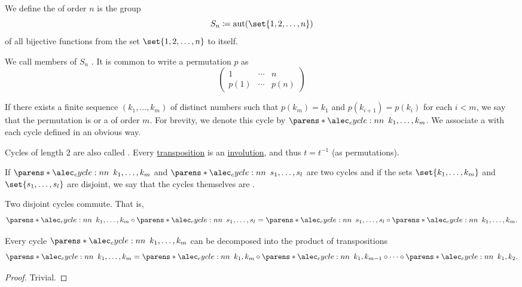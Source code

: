 \begin{definition}\label{def:symmetric_group}
  We define the  of order \( n \) is the group
  \begin{equation*}
    S_n \coloneqq \aut(\set{ 1, 2, \ldots, n })
  \end{equation*}
  of all bijective functions from the set \( \set{ 1, 2, \ldots, n } \) to itself.

  \begin{thmenum}
     We call members of \( S_n \) . It is common to write a permutation \( p \) as
    \begin{equation*}
      \begin{pmatrix}
        1    & \cdots & n \\
        p(1) & \cdots & p(n)
      \end{pmatrix}
    \end{equation*}

     If there exists a finite sequence \( (k_1, \ldots, k_m) \) of distinct numbers such that \( p(k_m) = k_1 \) and \( p(k_{i+1}) = p(k_i) \) for each \( i < m \), we say that the permutation is  or a  of order \( m \). For brevity, we denote this cycle by \( \cycle{k_1, \ldots, k_m} \). We associate a  with each cycle defined in an obvious way.

    Cycles of length \( 2 \) are also called . Every \hyperref[def:symmetric_group/cycle]{transposition} is an \hyperref[def:set_with_involution]{involution}, and thus \( t = t^{-1} \) (as permutations).

     If \( \cycle{k_1, \ldots, k_m} \) and \( \cycle{s_1, \ldots, s_l} \) are two cycles and if the sets \( \set{ k_1, \ldots, k_m } \) and \( \set{ s_1, \ldots, s_l } \) are disjoint, we say that the cycles themselves are .

    Two disjoint cycles commute. That is,
    \begin{equation*}
      \cycle{k_1, \ldots, k_m} \bincirc \cycle{s_1, \ldots, s_l} = \cycle{s_1, \ldots, s_l} \bincirc \cycle{k_1, \ldots, k_m}.
    \end{equation*}
  \end{thmenum}
\end{definition}

\begin{proposition}\label{thm:cycle_transposition_decomposition}
  Every cycle \( \cycle{ k_1, \ldots, k_m } \) can be decomposed into the product of transpositions
  \begin{equation*}
    \cycle{ k_1, \ldots, k_m } = \cycle{ k_1, k_m } \bincirc \cycle{ k_1, k_{m-1} } \bincirc \cdots \bincirc \cycle{ k_1, k_2 }.
  \end{equation*}
\end{proposition}
\begin{proof}
  Trivial.
\end{proof}

